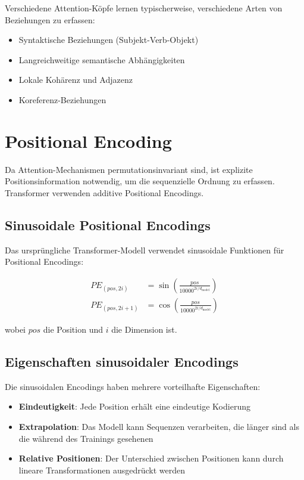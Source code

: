 Verschiedene Attention-Köpfe lernen typischerweise, verschiedene Arten von Beziehungen zu erfassen:
\begin{itemize}
    \item Syntaktische Beziehungen (Subjekt-Verb-Objekt)
    \item Langreichweitige semantische Abhängigkeiten
    \item Lokale Kohärenz und Adjazenz
    \item Koreferenz-Beziehungen
\end{itemize}

\section{Positional Encoding}

Da Attention-Mechanismen permutationsinvariant sind, ist explizite Positionsinformation notwendig, um die sequenzielle Ordnung zu erfassen. Transformer verwenden additive Positional Encodings.

\subsection{Sinusoidale Positional Encodings}

Das ursprüngliche Transformer-Modell verwendet sinusoidale Funktionen für Positional Encodings:

\begin{align}
PE_{(pos, 2i)} &= \sin\left(\frac{pos}{10000^{2i/d_{\text{model}}}}\right) \\
PE_{(pos, 2i+1)} &= \cos\left(\frac{pos}{10000^{2i/d_{\text{model}}}}\right)
\end{align}

wobei $pos$ die Position und $i$ die Dimension ist.

\subsection{Eigenschaften sinusoidaler Encodings}

Die sinusoidalen Encodings haben mehrere vorteilhafte Eigenschaften:
\begin{itemize}
    \item \textbf{Eindeutigkeit}: Jede Position erhält eine eindeutige Kodierung
    \item \textbf{Extrapolation}: Das Modell kann Sequenzen verarbeiten, die länger sind als die während des Trainings gesehenen
    \item \textbf{Relative Positionen}: Der Unterschied zwischen Positionen kann durch lineare Transformationen ausgedrückt werden
\end{itemize}

